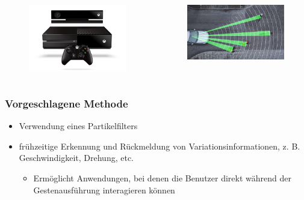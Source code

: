 \documentclass{beamer}
\begin{document}
\begin{frame}
\begin{itemize}
\begin{itemize}
\end{itemize}
\end{itemize}
\begin{columns}
\begin{column}{0.4\textwidth}
\begin{figure}
\centering
\includegraphics[width=0.7\linewidth]{../Bilder/xbox}
\label{fig:xbox}
\end{figure}
\end{column}
\begin{column}{0.4\textwidth}
\begin{figure}
\centering
\includegraphics[width=0.7\linewidth]{../Bilder/fussgaenger}
\label{fig:fussgaenger}
\end{figure}
\end{column}
\end{columns}
\end{frame}
\begin{frame}\frametitle{Vorgeschlagene Methode}  
\begin{itemize}
\item Verwendung eines Partikelfilters
\item frühzeitige Erkennung und Rückmeldung von Variationsinformationen, z. B. Geschwindigkeit, Drehung, etc.
\begin{itemize}
\item Ermöglicht Anwendungen, bei denen die Benutzer direkt während der Gestenausführung interagieren können
\end{itemize}
\end{itemize}
\end{frame}
\end{document}
